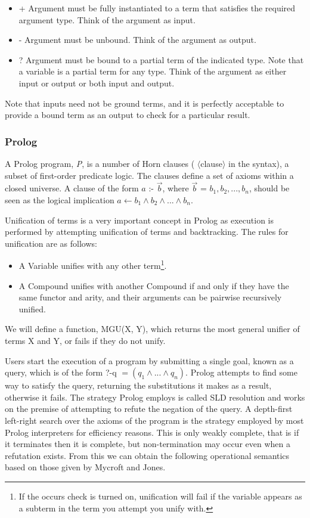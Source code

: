 \documentclass[12pt,a4paper,twoside,openright]{report}
\begin{document}
\begin{itemize}
	\item + Argument must be fully instantiated to a term that satisfies the required argument type. Think of the argument as input.
	\item - Argument must be unbound. Think of the argument as output. 
	\item ? Argument must be bound to a partial term of the indicated type. Note that a variable is a partial term for any type. Think of the argument as either input or output or both input and output.
\end{itemize}

Note that inputs need not be ground terms, and it is perfectly acceptable to provide a bound term as an output to check for a particular result.

\subsubsection {Prolog}

A Prolog program, \emph{P}, is a number of Horn clauses ( $\langle$clause$\rangle$ in the syntax), a subset of first-order predicate logic. The clauses define a set of axioms within a closed universe. A clause of the form $a$ :- $\vec{b}$, where $\vec{b}$ = $b_1, b_2, ..., b_n$, should be seen as the logical implication $a \leftarrow b_1 \land b_2 \land ... \land b_n$. 

\bigskip

Unification of terms is a very important concept in Prolog as execution is performed by attempting unification of terms and backtracking. The rules for unification are as follows:

\begin{itemize}
	\item A Variable unifies with any other term\footnote{If the occurs check is turned on, unification will fail if the variable appears as a subterm in the term you attempt you unify with.}.
 	\item A Compound unifies with another Compound if and only if they have the same functor and arity, and their arguments can be pairwise recursively unified.
\end{itemize}

We will define a function, MGU(X, Y), which returns the most general unifier of terms X and Y, or fails if they do not unify.

\bigskip

Users start the execution of a program by submitting a single goal, known as a query, which is of the form ?-q $ = (q_1 \land ... \land q_n)$. Prolog attempts to find some way to satisfy the query, returning the substitutions it makes as a result, otherwise it fails. The strategy Prolog employs is called SLD resolution and works on the premise of attempting to refute the negation of the query. A depth-first left-right search over the axioms of the program is the strategy employed by most Prolog interpreters for efficiency reasons. This is only weakly complete, that is if it terminates then it is complete, but non-termination may occur even when a refutation exists. From this we can obtain the following operational semantics based on those given by Mycroft and Jones\cite{MYCROFT}.
\end{document}
